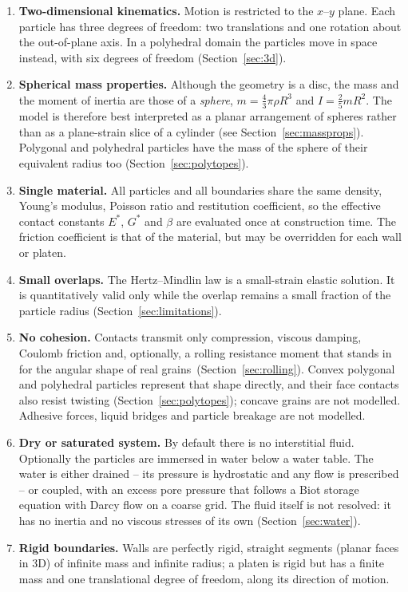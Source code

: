 \begin{enumerate}[leftmargin=2.2em,label=A\arabic*.]
  \item \textbf{Two-dimensional kinematics.}  Motion is restricted to the
        $x$--$y$ plane.  Each particle has three degrees of freedom: two
        translations and one rotation about the out-of-plane axis.
        In a polyhedral domain the particles move in space instead, with six degrees of freedom (Section~\ref{sec:3d}).
  \item \textbf{Spherical mass properties.}  Although the geometry is a disc,
        the mass and the moment of inertia are those of a \emph{sphere},
        $m=\tfrac{4}{3}\pi\rho R^{3}$ and $I=\tfrac{2}{5}mR^{2}$.  The model is
        therefore best interpreted as a planar arrangement of spheres rather
        than as a plane-strain slice of a cylinder
        (see Section~\ref{sec:massprops}).
        Polygonal and polyhedral particles have the mass of the sphere of their equivalent radius too
        (Section~\ref{sec:polytopes}).
  \item \textbf{Single material.}  All particles and all boundaries share the
        same density, Young's modulus, Poisson ratio and restitution
        coefficient, so the effective contact constants $E^{*}$, $G^{*}$ and
        $\beta$ are evaluated once at construction time.  The friction
        coefficient is that of the material, but may be overridden for each
        wall or platen.
  \item \textbf{Small overlaps.}  The Hertz--Mindlin law is a small-strain
        elastic solution.  It is quantitatively valid only while the overlap
        remains a small fraction of the particle radius
        (Section~\ref{sec:limitations}).
  \item \textbf{No cohesion.}  Contacts transmit only compression, viscous
        damping, Coulomb friction and, optionally, a rolling resistance moment
        that stands in for the angular shape of real
        grains~(Section~\ref{sec:rolling}).
        Convex polygonal and polyhedral particles represent that shape directly, and their face contacts also resist
        twisting (Section~\ref{sec:polytopes}); concave grains are not modelled.  Adhesive forces, liquid bridges and
        particle breakage are not modelled.
  \item \textbf{Dry or saturated system.}  By default there is no interstitial
        fluid.  Optionally the particles are immersed in water below a water
        table.  The water is either drained -- its pressure is hydrostatic and
        any flow is prescribed -- or coupled, with an excess pore pressure that
        follows a Biot storage equation with Darcy flow on a coarse grid.  The
        fluid itself is not resolved: it has no inertia and no viscous stresses
        of its own (Section~\ref{sec:water}).
  \item \textbf{Rigid boundaries.}  Walls are perfectly rigid, straight
        segments (planar faces in 3D) of infinite mass and infinite radius; a platen is rigid but has
        a finite mass and one translational degree of freedom, along its
        direction of motion.
\end{enumerate}

